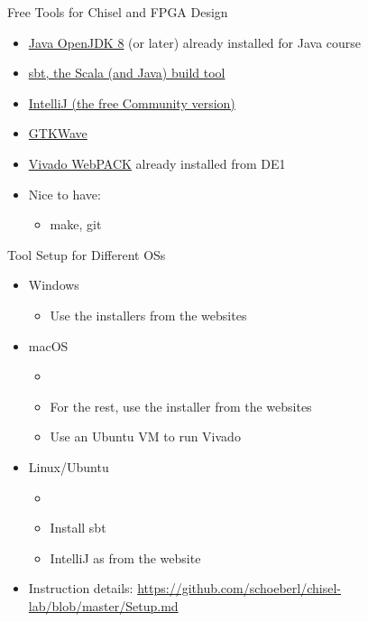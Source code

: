 \begin{frame}[fragile]{Free Tools for Chisel and FPGA Design}
\begin{itemize}
\item \href{https://adoptopenjdk.net/}{Java OpenJDK 8} (or later) already installed for Java course
\item \href{https://www.scala-sbt.org/}{sbt, the Scala (and Java) build tool}
\item \href{https://www.jetbrains.com/idea/download/}{IntelliJ (the free Community version)}
\item \href{http://gtkwave.sourceforge.net/}{GTKWave}
\item \href{https://www.xilinx.com/products/design-tools/vivado/vivado-webpack.html}{Vivado WebPACK} already installed from DE1
\item Nice to have:
\begin{itemize}
\item make, git
\end{itemize}
\end{itemize}
\end{frame}

\begin{frame}[fragile]{Tool Setup for Different OSs}
\begin{itemize}
\item Windows
\begin{itemize}
\item Use the installers from the websites
\end{itemize}
\item macOS
\begin{itemize}
\item {}
\item For the rest, use the installer from the websites
\item Use an Ubuntu VM to run Vivado
\end{itemize}
\item Linux/Ubuntu
\begin{itemize}
\item {}
\item Install sbt
\item IntelliJ as from the website
\end{itemize}
\item Instruction details: \url{https://github.com/schoeberl/chisel-lab/blob/master/Setup.md}
\end{itemize}
\end{frame}

